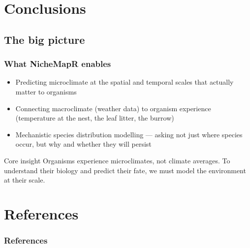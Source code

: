 \documentclass{beamer}
\begin{document}
\section{Conclusions}
\subsection{The big picture}

\begin{frame}
  \frametitle{What NicheMapR enables}

  \begin{itemize}
    \item Predicting microclimate at the spatial and temporal scales that actually matter to organisms
    \item Connecting macroclimate (weather data) to organism experience (temperature at the nest, the leaf litter, the burrow)
    \item Mechanistic species distribution modelling --- asking not just where species occur, but why and whether they will persist
  \end{itemize}

  \vspace{0.3cm}

  \begin{alertblock}{Core insight}
    Organisms experience microclimates, not climate averages. To understand their biology and predict their fate, we must model the environment at their scale.
  \end{alertblock}
\end{frame}

\section{References}

\begin{frame}[allowframebreaks]
  \frametitle{References}
  \printbibliography[heading=none]
\end{frame}
\end{document}
